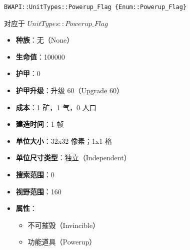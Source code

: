 \begin{tcolorbox}[colback=white, colframe=black!60!white, title=Powerup\_Flag(), arc=0mm]
    \begin{verbatim}
BWAPI::UnitTypes::Powerup_Flag {Enum::Powerup_Flag}
    \end{verbatim}
    对应于  $UnitTypes::Powerup\_Flag$ 
    \begin{itemize}
        \item \textbf{种族}：无（None）
        \item \textbf{生命值}：100000
        \item \textbf{护甲}：0
        \item \textbf{护甲升级}：升级 60（Upgrade 60）
        \item \textbf{成本}：1 矿，1 气，0 人口
        \item \textbf{建造时间}：1 帧
        \item \textbf{单位大小}：32x32 像素；1x1 格
        \item \textbf{单位尺寸类型}：独立（Independent）
        \item \textbf{搜索范围}：0
        \item \textbf{视野范围}：160
        \item \textbf{属性}：
            \begin{itemize}
                \item 不可摧毁（Invincible）
                \item 功能道具（Powerup）
            \end{itemize}
    \end{itemize}
\end{tcolorbox}

